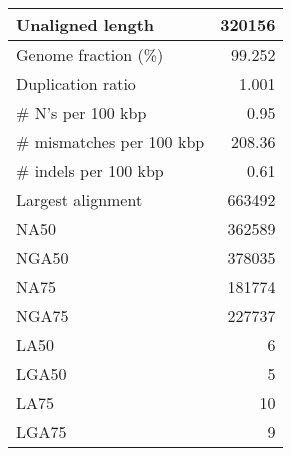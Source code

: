 \documentclass[12pt,a4paper]{article}
\begin{document}
\begin{table}[ht]
\begin{center}
\begin{tabular}{|l*{1}{|r}|}
Unaligned length & 320156 \\ \hline
Genome fraction (\%) & 99.252 \\ \hline
Duplication ratio & 1.001 \\ \hline
\# N's per 100 kbp & 0.95 \\ \hline
\# mismatches per 100 kbp & 208.36 \\ \hline
\# indels per 100 kbp & 0.61 \\ \hline
Largest alignment & 663492 \\ \hline
NA50 & 362589 \\ \hline
NGA50 & 378035 \\ \hline
NA75 & 181774 \\ \hline
NGA75 & 227737 \\ \hline
LA50 & 6 \\ \hline
LGA50 & 5 \\ \hline
LA75 & 10 \\ \hline
LGA75 & 9 \\ \hline
\end{tabular}
\end{center}
\end{table}
\end{document}
